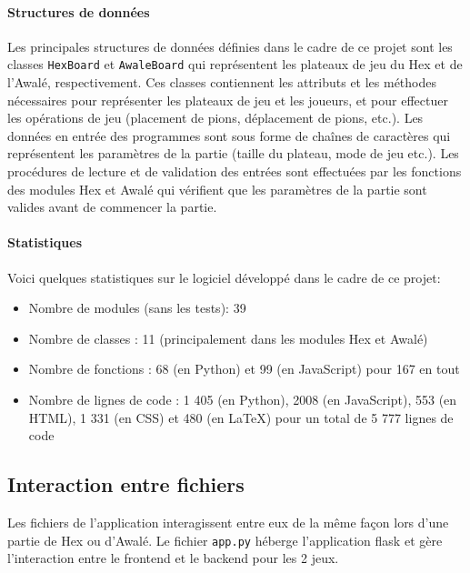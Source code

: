 \paragraph{Structures de données}
Les principales structures de données définies dans le cadre de ce projet sont les classes
\texttt{HexBoard} et \texttt{AwaleBoard} qui représentent les plateaux de jeu du Hex et de
l'Awalé, respectivement. Ces classes contiennent les attributs et les méthodes nécessaires
pour représenter les plateaux de jeu et les joueurs, et pour effectuer les opérations de jeu
(placement de pions, déplacement de pions, etc.). Les données en entrée des programmes sont
sous forme de chaînes de caractères qui représentent les paramètres de la partie (taille du
plateau, mode de jeu etc.). Les procédures de lecture et de validation
des entrées sont effectuées par les fonctions des modules Hex et Awalé qui vérifient que les
paramètres de la partie sont valides avant de commencer la partie.

\paragraph{Statistiques}
Voici quelques statistiques sur le logiciel développé dans le cadre de ce projet:
\begin{itemize}
    \item Nombre de modules (sans les tests): 39
    \item Nombre de classes : 11 (principalement dans les modules Hex et Awalé)
    \item Nombre de fonctions : 68 (en Python) et 99 (en JavaScript) pour 167 en tout
    \item Nombre de lignes de code : 1 405 (en Python), 2008 (en JavaScript), 553 (en HTML), 1 331 (en CSS)
    et 480 (en \LaTeX) pour un total de 5 777 lignes de code
\end{itemize}

\subsection{Interaction entre fichiers}
Les fichiers de l'application interagissent entre eux de la même façon lors d'une partie de Hex ou 
d'Awalé. Le fichier \texttt{app.py} héberge l'application flask et gère l'interaction entre le frontend et le 
backend pour les 2 jeux.

